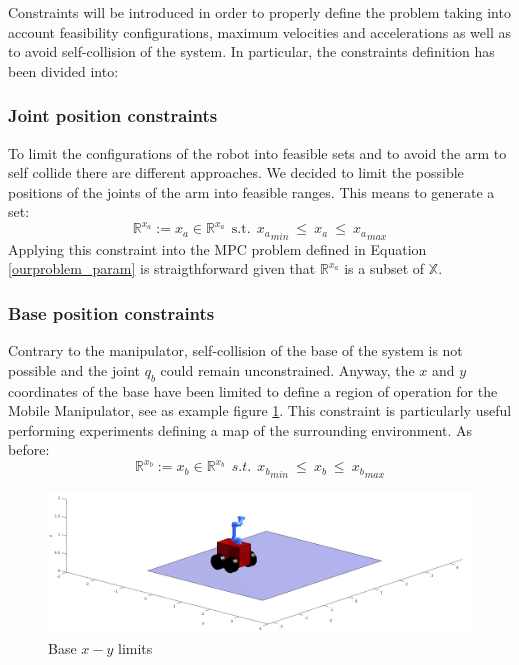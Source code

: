 Constraints will be introduced in order to properly define the problem taking into account feasibility configurations, maximum velocities and accelerations as well as to avoid self-collision of the system. In particular, the constraints definition has been divided into: 

\subsubsection*{Joint position constraints}
	To limit the configurations of the robot into feasible sets and to avoid the arm to self collide there are different approaches. We decided to limit the possible positions of the joints of the arm into feasible ranges. This means to generate a set:
	\begin{equation}
		\mathbb{R}^{x_a}:=x_a \in \mathbb{R}^{x_a}\ \ \text{s.t.}\ \  {x_a}_{min}\ \leq\ x_a\ \leq\ {x_a}_{max} 
	\end{equation}
	Applying this constraint into the MPC problem defined in Equation \ref{ourproblem_param} is straigthforward given that $\mathbb{R}^{x_a}$ is a subset of $\mathbb{X}$.
\subsubsection*{Base position constraints}
	Contrary to the manipulator, self-collision of the base of the system is not possible and the joint $q_b$ could remain unconstrained. Anyway, the $x$ and $y$ coordinates of the base have been limited to define a region of operation for the Mobile Manipulator, see as example figure \ref{xy_limits}. This constraint is particularly useful performing experiments defining a map of the surrounding environment. As before: 
	\begin{equation}
		\mathbb{R}^{x_b}:=x_b \in \mathbb{R}^{x_b}\ \ s.t.\ \  {x_b}_{min}\ \leq\ x_b\ \leq\ {x_b}_{max} 
	\end{equation}

	\begin{figure}[h!]
	\centering
	\includegraphics[scale=0.25]{IMMAGINI/xy_limits.png}
	\caption{Base $x-y$ limits}
	\label{xy_limits}
	\end{figure}

